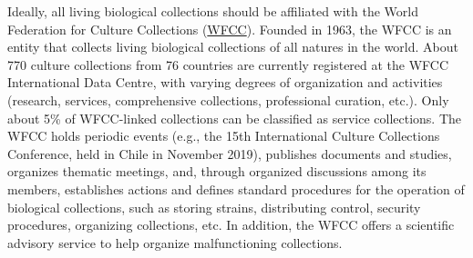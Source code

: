 Ideally, all living biological collections should be affiliated with the World Federation for Culture Collections (\href{http://www.wfcc.info}{WFCC}). Founded in 1963, the WFCC is an entity that collects living biological collections of all natures in the world. About 770 culture collections from 76 countries are currently registered at the WFCC International Data Centre, with varying degrees of organization and activities (research, services, comprehensive collections, professional curation, etc.). Only about 5\% of WFCC-linked collections can be classified as service collections. The WFCC holds periodic events (e.g., the 15th International Culture Collections Conference, held in Chile in November 2019), publishes documents and studies, organizes thematic meetings, and, through organized discussions among its members, establishes actions and defines standard procedures for the operation of biological collections, such as storing strains, distributing control, security procedures, organizing collections, etc. In addition, the WFCC offers a scientific advisory service to help organize malfunctioning collections.

